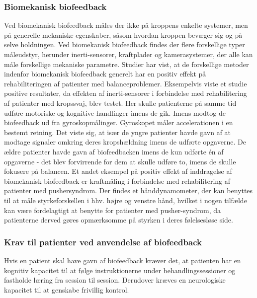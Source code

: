 \subsubsection{Biomekanisk biofeedback}
Ved biomekanisk biofeedback måles der ikke på kroppens enkelte systemer, men på generelle mekaniske egenskaber, såsom hvordan kroppen bevæger sig og på selve holdningen.  
Ved biomekanisk biofeedback findes der flere forskellige typer måleudstyr, herunder inerti-sensorer, kraftplader og kamerasystemer, der alle kan måle forskellige mekaniske parametre. Studier har vist, at de forskellige metoder indenfor biomekanisk biofeedback generelt har en positiv effekt på rehabiliteringen af patienter med balanceproblemer. Eksempelvis viste et studie positive resultater, da effekten af inerti-sensorer i forbindelse med rehabilitering af patienter med kropssvaj, blev testet. Her skulle patienterne på samme tid udføre motoriske og kognitive handlinger imens de gik. Imens modtog de biofeedback ud fra gyroskopmålinger. Gyroskopet måler accelerationen i en bestemt retning\cite{Hjaelpemiddelbasen}. Det viste sig, at især de yngre patienter havde gavn af at modtage signaler omkring deres kropshældning imens de udførte opgaverne. De ældre patienter havde gavn af biofeedbacken imens de kun udførte én af opgaverne - det blev forvirrende for dem at skulle udføre to, imens de skulle fokusere på balancen. 
Et andet eksempel på positiv effekt af inddragelse af biomekanisk biofeedback er kraftmåling i forbindelse med rehabilitering af patienter med pushersyndrom.
Der findes et hånddynamometer, der kan benyttes til at måle styrkeforskellen i hhv. højre og venstre hånd, hvilket i nogen tilfælde kan være fordelagtigt at benytte for patienter med pusher-syndrom, da patienterne derved gøres opmærksomme på styrken i deres følelsesløse side.\cite{Hjaelpemiddelbasen}

\subsubsection{Krav til patienter ved anvendelse af biofeedback}
Hvis en patient skal have gavn af biofeedback kræver det, at patienten har en kognitiv kapacitet til at følge instruktionerne under behandlingssessioner og fastholde læring fra session til session. Derudover kræves en neurologiske kapacitet til at genskabe frivillig kontrol. \cite{Middaugh1989} \\


 


